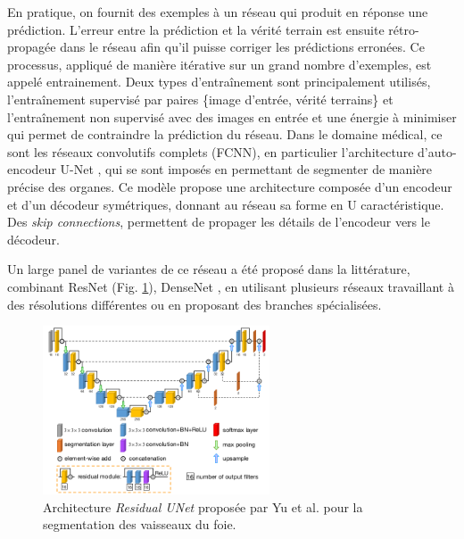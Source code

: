       En pratique, on fournit des exemples à un réseau qui produit en réponse une prédiction. L'erreur entre la prédiction et la vérité terrain est ensuite rétro-propagée dans le réseau afin qu'il puisse corriger les prédictions erronées. Ce processus, appliqué de manière itérative sur un grand nombre d'exemples, est appelé entrainement. Deux types d'entraînement sont principalement utilisés, l'entraînement supervisé par paires \{image d'entrée, vérité terrains\} et l'entraînement non supervisé avec des images en entrée et une énergie à minimiser qui permet de contraindre la prédiction du réseau.
      Dans le domaine médical, ce sont les réseaux convolutifs complets (FCNN), en particulier l'architecture d'auto-encodeur U-Net \cite{Ronneberger2015_Unet}, qui se sont imposés en permettant de segmenter de manière précise des organes. Ce modèle propose une architecture composée d'un encodeur et d'un décodeur symétriques, donnant au réseau sa forme en U caractéristique. Des \textit{skip connections}, permettent de propager les détails de l'encodeur vers le décodeur.

      Un large panel de variantes de ce réseau a été proposé dans la littérature, combinant ResNet \cite{yu2019_liver_ResUnet}(Fig. \ref{fig:yu_resunet}), DenseNet \cite{Li2018_DenseUnet}, en utilisant plusieurs réseaux travaillant à des résolutions différentes ou en proposant des branches spécialisées.
      
      \begin{figure}[!ht]
        \centering
        \includegraphics[height=5cm]{Images/Residual_Unet_Yu.png}
        \caption{Architecture \textit{Residual UNet} proposée par Yu et al. \cite{yu2019_liver_ResUnet} pour la segmentation des vaisseaux du foie.}
        \label{fig:yu_resunet}
      \end{figure}
      
